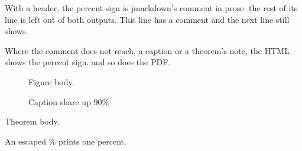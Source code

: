 With a header, the percent sign is jmarkdown's comment in prose: the rest of
its line is left out of both outputs. This line has a comment and the next line still shows.

Where the comment does not reach, a caption or a theorem's note, the HTML
shows the percent sign, and so does the PDF.

\begin{figure}[htbp]
\centering
Figure body.

\caption{Caption share up 90\%}
\label{fig:pct}
\end{figure}

\begin{theorem}
Theorem body.
\end{theorem}

An escaped \% prints one percent.


